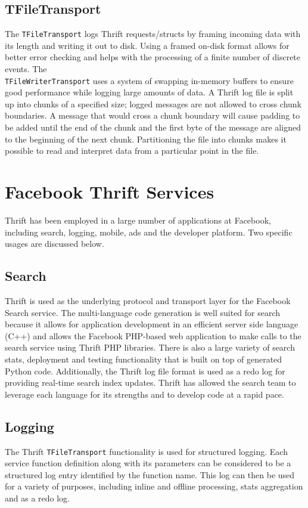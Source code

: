 \documentclass[nocopyrightspace,blockstyle]{sigplanconf}
\begin{document}
\subsection{TFileTransport}
The \texttt{TFileTransport} logs Thrift requests/structs by 
framing incoming data with its length and writing it out to disk. 
Using a framed on-disk format allows for better error checking and 
helps with the processing of a finite number of discrete events. The\\
\texttt{TFileWriterTransport} uses a system of swapping in-memory buffers 
to ensure good performance while logging large amounts of data. 
A Thrift log file is split up into chunks of a specified size; logged messages
are not allowed to cross chunk boundaries. A message that would cross a chunk 
boundary will cause padding to be added until the end of the chunk and the 
first byte of the message are aligned to the beginning of the next chunk.
Partitioning the file into chunks makes it possible to read and interpret data 
from a particular point in the file. 

\section{Facebook Thrift Services}
Thrift has been employed in a large number of applications at Facebook, including
search, logging, mobile, ads and the developer platform. Two specific usages are discussed below.

\subsection{Search}
Thrift is used as the underlying protocol and transport layer for the Facebook Search service.
The multi-language code generation is well suited for search because it allows for application
development in an efficient server side language (C++) and allows the Facebook PHP-based web application
to make calls to the search service using Thrift PHP libraries. There is also a large
variety of search stats, deployment and testing functionality that is built on top 
of generated Python code. Additionally, the Thrift log file format is
used as a redo log for providing real-time search index updates. Thrift has allowed the 
search team to leverage each language for its strengths and to develop code at a rapid pace. 

\subsection{Logging}
The Thrift \texttt{TFileTransport} functionality is used for structured logging. Each
service function definition along with its parameters can be considered to be
a structured log entry identified by the function name. This log can then be used for 
a variety of purposes, including inline and offline processing, stats aggregation and as a redo log.
\end{document}
